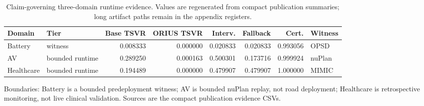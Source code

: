 \begin{table}[htbp]
\centering
\scriptsize
\caption{Claim-governing three-domain runtime evidence. Values are regenerated from compact publication summaries; long artifact paths remain in the appendix registers.}
\label{tab:claim-governing-runtime-evidence}
\begin{tabular}{@{}llrrrrrl@{}}
\toprule
Domain & Tier & Base TSVR & ORIUS TSVR & Interv. & Fallback & Cert. & Witness\\
\midrule
Battery & witness & 0.008333 & 0.000000 & 0.020833 & 0.020833 & 0.993056 & OPSD\\
AV & bounded runtime & 0.289250 & 0.000163 & 0.500301 & 0.173716 & 0.999924 & nuPlan\\
Healthcare & bounded runtime & 0.194489 & 0.000000 & 0.479907 & 0.479907 & 1.000000 & MIMIC\\
\bottomrule
\end{tabular}
\par\smallskip
\footnotesize Boundaries: Battery is a bounded predeployment witness; AV is bounded nuPlan replay, not road deployment; Healthcare is retrospective monitoring, not live clinical validation. Sources are the compact publication evidence CSVs.
\end{table}
